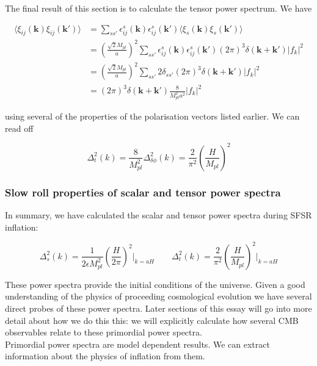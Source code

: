\documentclass[a4paper,10pt]{article}
\renewcommand{\v}[1]{\mathbf{#1}}
\newcommand{\Mp}{M_{pl}}
\begin{document}
The final result of this section is to calculate the tensor power spectrum. We have

\begin{equation}\begin{split}
\langle\xi_{ij}(\v{k})\xi_{ij}(\v{k'})\rangle & = \sum_{ss'} \epsilon^s_{ij}(\v{k})\epsilon^s_{ij}(\v{k'})\langle\xi_{s}(\v{k})\xi_{s}(\v{k'})\rangle\\
&= (\frac{\sqrt{2}\Mp}{a})^2 \sum_{ss'} \epsilon^s_{ij}(\v{k})\epsilon^s_{ij}(\v{k'})(2\pi)^3\delta(\v{k}+\v{k'})|f_k|^2\\
&= (\frac{\sqrt{2}\Mp}{a})^2 \sum_{ss'} 2\delta_{ss'}(2\pi)^3\delta(\v{k}+\v{k'})|f_k|^2\\
&= (2\pi)^3\delta(\v{k}+\v{k'})\frac{8}{\Mp^2a^2}|f_k|^2
\end{split}\end{equation}

using several of the properties of the polarisation vectors listed earlier. We can read off 

\begin{equation}
\Delta^2_t(k)=\frac{8}{\Mp^2}\Delta^2_{\delta\phi}(k) = \frac{2}{\pi^2}(\frac{H}{\Mp})^2
\end{equation}


\subsubsection{Slow roll properties of scalar and tensor power spectra}

In summary, we have calculated the scalar and tensor power spectra during SFSR inflation:

\begin{equation}
\Delta^2_{s}(k) = \frac{1}{2\epsilon\Mp^2}(\frac{H}{2\pi})^2\rvert_{k=aH} \qquad
\Delta^2_t(k)= \frac{2}{\pi^2}(\frac{H}{\Mp})^2\rvert_{k=aH}
\end{equation}

These power spectra provide the initial conditions of the universe. Given a good understanding of the physics of proceeding cosmological evolution we have several direct probes of these power spectra. Later sections of this essay will go into more detail about how we do this this: we will explicitly calculate how several CMB observables relate to these primordial power spectra.\\

Primordial power spectra are model dependent results. We can extract information about the physics of inflation from them. \\
\end{document}

